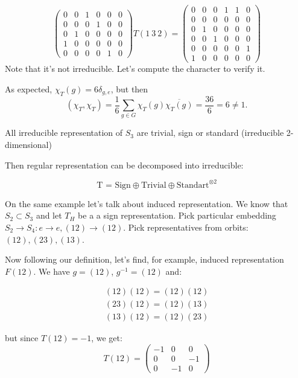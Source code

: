 \documentclass{amsart}
\begin{document}
{\begin{equation*}
\begin{pmatrix}
        0 & 0 & 1 & 0 & 0 & 0\\
        0 & 0 & 0 & 1 & 0 & 0\\
        0 & 1 & 0 & 0 & 0 & 0\\
        1 & 0 & 0 & 0 & 0 & 0\\
        0 & 0 & 0 & 0 & 1 & 0
    \end{pmatrix}
    T (1\ 3\ 2) = \begin{pmatrix}
        0 & 0 & 0 & 1 & 1 & 0\\ 
        0 & 0 & 0 & 0 & 0 & 0\\
        0 & 1 & 0 & 0 & 0 & 0\\
        0 & 0 & 1 & 0 & 0 & 0\\
        0 & 0 & 0 & 0 & 0 & 1\\
        1 & 0 & 0 & 0 & 0 & 0
    \end{pmatrix}
\end{equation*}
}
Note that it's not irreducible. Let's compute the character to verify it.

As expected, $\chi_T (g) = 6 \delta_{g, e}$, but then $$(\chi_T, \chi_T) = \frac{1}{6} \sum_{g \in G} \chi_T(g) \overline{\chi_T(g)} = \frac{36}{6} = 6 \neq 1.$$

\begin{lemma}
    All irreducible representation of $S_3$ are trivial, sign or standard (irreducible 2-dimensional) 
\end{lemma}
Then regular representation can be decomposed into irreducible:

$$ \text{T = Sign} \oplus \text{Trivial} \oplus \text{Standart}^{\otimes 2}$$

On the same example let's talk about induced representation. We know that $S_2 \subset S_3$ and let $T_H$ be a a sign representation.
Pick particular embedding $S_2 \to S_4: e \to e, (12) \to (12)$. Pick representatives from orbits: $(12), (23), (13)$.

Now following our definition, let's find, for example, induced representation $F(12)$.
We have $g = (12)$, $g^{-1} = (12)$ and:

\begin{align*}
    (12) (12) = (12) (12)\\
    (23) (12) = (12) (13)\\
    (13) (12) = (12) (23)
\end{align*}

but since $T(12) = -1$, we get:
\begin{equation*}
    T(12) = \begin{pmatrix}
        -1 & 0 & 0 \\
        0 & 0 & -1 \\
        0 & -1 & 0  
    \end{pmatrix}
\end{equation*}
\end{document}
